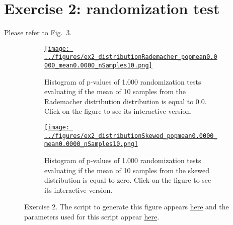 \documentclass[12pt]{article}
\def\fig_width{3.5in}
\begin{document}
\section*{Exercise 2: randomization test}

Please refer to Fig.~\ref{fig:ex2}.

\begin{figure}[H]
    \begin{center}

        \begin{subfigure}{1.0\textwidth}
            \centering
            \href{https://www.gatsby.ucl.ac.uk/~rapela/neuroinformatics/2023/ws1/figures/ex2_distributionRademacher_popmean0.0000_mean0.0000_nSamples10.html}{\texttt{[image: ../figures/ex2\_distributionRademacher\_popmean0.0000\_mean0.0000\_nSamples10.png]}}

            \caption{Histogram of p-values of 1.000 randomization tests evaluating
            if the mean of 10 samples from the Rademacher
            distribution distribution is equal to 0.0.  Click on the
            figure to see its interactive version.}

            \label{fig:ex2_1}
        \end{subfigure}

        \begin{subfigure}{1.0\textwidth}
            \centering
            \href{https://www.gatsby.ucl.ac.uk/~rapela/neuroinformatics/2023/ws1/figures/ex2_distributionSkewed_popmean0.0000_mean0.0000_nSamples10.html}{\texttt{[image: ../figures/ex2\_distributionSkewed\_popmean0.0000\_mean0.0000\_nSamples10.png]}}

            \caption{Histogram of p-values of 1.000 randomization tests evaluating if the mean
            of 10 samples from the skewed distribution is equal to zero.
            Click on the figure to see its interactive version.}

            \label{fig:ex2_2}
        \end{subfigure}

        \caption{Exercise 2. The script to generate this figure appears
        \href{https://github.com/joacorapela/neuroinformatics23/blob/master/worksheets/ws1/mySolution/code/scripts/doEx2.py}{here}
        and the parameters used for this script appear
        \href{https://github.com/joacorapela/neuroinformatics23/blob/master/worksheets/ws1/mySolution/code/scripts/doEx2.csh}{here}.
        }

        \label{fig:ex2}

    \end{center}
\end{figure}
\end{document}
